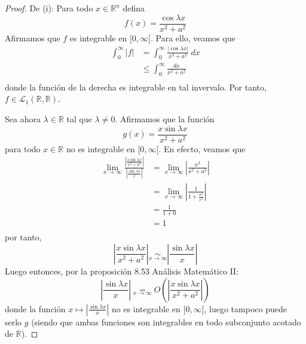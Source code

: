 \documentclass[12pt]{report}
\theoremstyle{largebreak}
\renewcommand{\leq}{\ensuremath{\leqslant}}
\newcommand\abs[1]{\ensuremath{\left|#1\right|}}
\begin{document}
    \begin{proof}
        De (i): Para todo $x\in\mathbb{R}^n$ defina
        \begin{equation*}
            f(x)=\frac{\cos\lambda x}{x^2+a^2}
        \end{equation*}
        Afirmamos que $f$ es integrable en $[0,\infty[$. Para ello, veamos que
        \begin{equation*}
            \begin{split}
                \int_{0}^{\infty}\abs{f}&=\int_{0}^{\infty}\frac{\abs{\cos\lambda x}}{x^2+a^2}\:dx\\
                &\leq\int_{0}^\infty\frac{dx}{x^2+a^2}\\
            \end{split}
        \end{equation*}
        donde la función de la derecha es integrable en tal invervalo. Por tanto, $f\in\mathcal{L}_1(\mathbb{R},\mathbb{R})$.

        Sea ahora $\lambda\in\mathbb{R}$ tal que $\lambda\neq0$. Afirmamos que la función
        \begin{equation*}
            g(x)=\frac{x\sin\lambda x}{x^2+a^2}
        \end{equation*}
        para todo $x\in\mathbb{R}$ no es integrable en $[0,\infty[$. En efecto, veamos que
        \begin{equation*}
            \begin{split}
                \lim_{ x\rightarrow\infty}\frac{\abs{\frac{x\sin\lambda x}{x^2+a^2}}}{\abs{\frac{\sin\lambda x}{x}}}&=\lim_{ x\rightarrow\infty}\abs{\frac{x^2}{x^2+a^2}}\\
                &=\lim_{ x\rightarrow\infty}\abs{\frac{1}{1+\frac{a^2}{x^2}}}\\
                &=\frac{1}{1+0}\\
                &=1\\
            \end{split}
        \end{equation*}
        por tanto,
        \begin{equation*}
            \abs{\frac{x\sin\lambda x}{x^2+a^2}}\underset{x\rightarrow\infty}{\sim}\abs{\frac{\sin\lambda x}{x}}
        \end{equation*}
        Luego entonces, por la proposición 8.53 Análisis Matemático II:
        \begin{equation*}
            \abs{\frac{\sin\lambda x}{x}}\underset{x\rightarrow\infty}{=}O\left(\abs{\frac{x\sin\lambda x}{x^2+a^2}}\right)
        \end{equation*}
        donde la función $x\mapsto\abs{\frac{\sin\lambda x}{x}}$ no es integrable en $[0,\infty[$, luego tampoco puede serlo $g$ (siendo que ambas funciones son integrables en todo subconjunto acotado de $\mathbb{R}$).


\end{proof}
\end{document}
